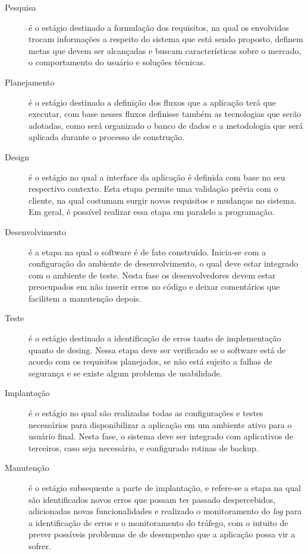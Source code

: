 \begin{description}
    \item[Pesquisa]{é o estágio destinado a formulação dos requisitos, na qual os
    envolvidos trocam informações a respeito do sistema que está sendo proposto,
    definem metas que devem ser alcançadas e buscam características sobre o mercado,
    o comportamento do usuário e soluções técnicas.}
    \item[Planejamento]{é o estágio destinado a definição dos fluxos que a aplicação
    terá que executar, com base nesses fluxos definisse também as tecnologias que
    serão adotadas, como será organizado o banco de dados e a metodologia que será
    aplicada durante o processo de construção.}
    \item[Design]{é o estágio no qual a interface da aplicação é definida com base
    no seu respectivo contexto. Esta etapa permite uma validação prévia com o cliente,
    na qual costumam surgir novos requisitos e mudanças no sistema. Em geral, é possível
    realizar essa etapa em paralelo a programação.}
    \item[Desenvolvimento]{é a etapa na qual o software é de fato construído. Inicia-se
    com a configuração do ambiente de desenvolvimento, o qual deve estar integrado com o
    ambiente de teste. Nesta fase os desenvolvedores devem estar preocupados em não
    inserir erros no código e deixar comentários que facilitem a manutenção depois.}
    \item[Teste]{é o estágio destinado a identificação de erros tanto de implementação
    quanto de desing. Nessa etapa deve ser verificado se o software está de acordo com
    os requisitos planejados, se não está sujeito a falhas de segurança e se existe
    algum problema de usabilidade.}
    \item[Implantação]{é o estágio no qual são realizadas todas as configurações e testes
    necessários para disponibilizar a aplicação em um ambiente ativo para o usuário final.
    Nesta fase, o sistema deve ser integrado com aplicativos de terceiros, caso seja
    necessário, e configurado rotinas de backup.}
    \item[Manutenção]{é o estágio subsequente a parte de implantação, e refere-se a etapa
    na qual são identificados novos erros que possam ter passado despercebidos, adicionadas
    novas funcionalidades e realizado o monitoramento do \textit{log} para a identificação
    de erros e o monitoramento do tráfego, com o intuito de prever possíveis problemas de
    de desempenho que a aplicação possa vir a sofrer.}
\end{description}

